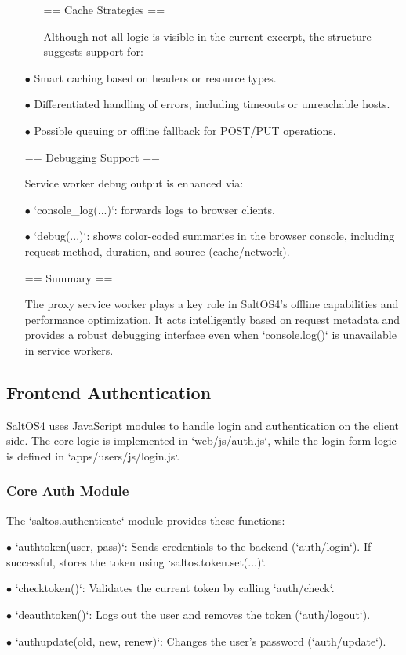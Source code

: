 \documentclass[a4paper]{article}
\begin{document}
\begin{itemize}
\begin{itemize}
== Cache Strategies ==

Although not all logic is visible in the current excerpt, the structure suggests support for:

    \end{itemize}
  \item[\color{myblue}$\bullet$] Smart caching based on headers or resource types.
  \item[\color{myblue}$\bullet$] Differentiated handling of errors, including timeouts or unreachable hosts.
  \item[\color{myblue}$\bullet$] Possible queuing or offline fallback for POST/PUT operations.

== Debugging Support ==

Service worker debug output is enhanced via:

  \item[\color{myblue}$\bullet$] `console\_log(...)`: forwards logs to browser clients.
  \item[\color{myblue}$\bullet$] `debug(...)`: shows color-coded summaries in the browser console, including request method, duration, and source (cache/network).

== Summary ==

The proxy service worker plays a key role in SaltOS4’s offline capabilities and performance optimization. It acts intelligently based on request metadata and provides a robust debugging interface even when `console.log()` is unavailable in service workers.
  \end{itemize}

\hypertarget{toc23}{}
\subsection{Frontend Authentication}

SaltOS4 uses JavaScript modules to handle login and authentication on the client side. The core logic is implemented in `web/js/auth.js`, while the login form logic is defined in `apps/users/js/login.js`.

\hypertarget{toc24}{}
\subsubsection{Core Auth Module}

The `saltos.authenticate` module provides these functions:

\begin{compactitem}
\item[\color{myblue}$\bullet$] `authtoken(user, pass)`: Sends credentials to the backend (`auth/login`). If successful, stores the token using `saltos.token.set(...)`.
\item[\color{myblue}$\bullet$] `checktoken()`: Validates the current token by calling `auth/check`.
\item[\color{myblue}$\bullet$] `deauthtoken()`: Logs out the user and removes the token (`auth/logout`).
\item[\color{myblue}$\bullet$] `authupdate(old, new, renew)`: Changes the user's password (`auth/update`).
\end{compactitem}
\end{document}
